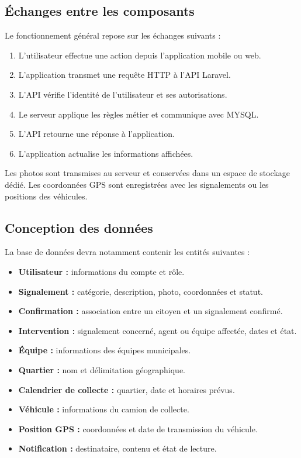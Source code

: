 \documentclass[11pt,a4paper,oneside]{report}
\begin{document}
	\subsection{Échanges entre les composants}
	
	Le fonctionnement général repose sur les échanges suivants :
	
	\begin{enumerate}
		\item L'utilisateur effectue une action depuis l'application
		mobile ou web.
		\item L'application transmet une requête HTTP à l'API Laravel.
		\item L'API vérifie l'identité de l'utilisateur et ses autorisations.
		\item Le serveur applique les règles métier et communique
		avec MYSQL.
		\item L'API retourne une réponse à l'application.
		\item L'application actualise les informations affichées.
	\end{enumerate}
	
	Les photos sont transmises au serveur et conservées dans un espace
	de stockage dédié. Les coordonnées GPS sont enregistrées avec
	les signalements ou les positions des véhicules.
	
	\subsection{Conception des données}
	
	La base de données devra notamment contenir les entités suivantes :
	
	\begin{itemize}
		\item \textbf{Utilisateur :} informations du compte et rôle.
		\item \textbf{Signalement :} catégorie, description, photo,
		coordonnées et statut.
		\item \textbf{Confirmation :} association entre un citoyen
		et un signalement confirmé.
		\item \textbf{Intervention :} signalement concerné, agent ou
		équipe affectée, dates et état.
		\item \textbf{Équipe :} informations des équipes municipales.
		\item \textbf{Quartier :} nom et délimitation géographique.
		\item \textbf{Calendrier de collecte :} quartier, date et
		horaires prévus.
		\item \textbf{Véhicule :} informations du camion de collecte.
		\item \textbf{Position GPS :} coordonnées et date de transmission
		du véhicule.
		\item \textbf{Notification :} destinataire, contenu et état
		de lecture.
	\end{itemize}
	
\end{document}
